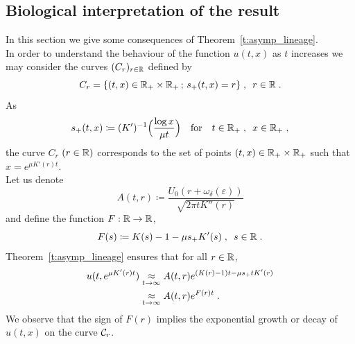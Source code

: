 \subsection{Biological interpretation of the result}
\label{s:bio_inter_courbe}

In this section we give some consequences of Theorem~\ref{t:asymp_lineage}. \\

In order to understand the behaviour of the function $u(t, x)$ as $t$ increases we may consider the curves $(C_r)_{r \in \mathbb{R}}$ defined by
$$ C_r = \{(t,x) \in \mathbb{R}_+ \times \mathbb{R}_+ \,;\, s_+(t, x) = r\}\; , \enspace r \in \mathbb{R} \; . $$ 
As \begin{align*}
    s_+(t,x) \coloneqq (K')^{-1} \Big( \frac{\log x}{\mu t} \Big)
    \quad \text{for} \quad t \in \mathbb{R}_+ \; , \enspace x \in \mathbb{R}_+
    \; ,
\end{align*}
the curve $C_r$ $(r \in \mathbb{R})$ corresponds to the set of points $(t,x) \in \mathbb{R}_+ \times \mathbb{R}_+$ such that $x = e^{\mu K'(r) t}.$ \\

Let us denote $$A(t,r) \coloneqq \frac{U_0(r+\omega_\delta(\varepsilon))}{\sqrt{2\pi tK''(r)}}$$ and define the function $F : \mathbb{R} \to \mathbb{R}$, 
\begin{equation}
    \label{eq:DET91}
    F(s) \coloneqq K(s)-1 -  \mu s_+ K'(s)
    \; , \enspace s \in \mathbb{R} 
    \; .
\end{equation}
Theorem~\ref{t:asymp_lineage} ensures that for all $r \in \mathbb{R}$, 
    \begin{align*}
        u(t,e^{\mu K'(r)t})
        &\underset{t \to \infty}{\approx}
        A(t,r) e^{(K(r)-1)t -  \mu s_+ t K'(r)} \\
        &\underset{t \to \infty}{\approx} A(t,r) e^{F(r)t}
        \; .
    \end{align*}
We observe that the sign of $F(r)$ implies the exponential growth or decay of $u(t, x)$ on the curve $\mathcal{C}_{r}$. \\

